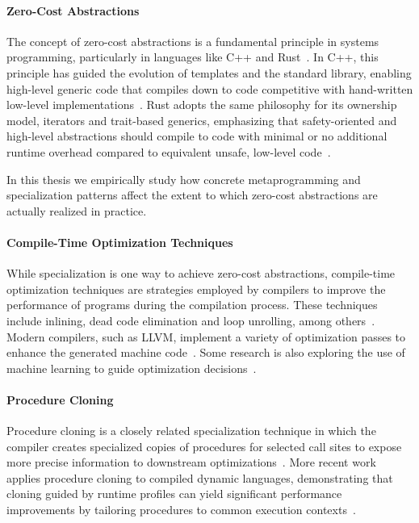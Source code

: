 \paragraph{Zero-Cost Abstractions}
The concept of zero-cost abstractions is a fundamental principle in systems programming, particularly in languages like C++ and Rust~\cite{Ho23}.
In C++, this principle has guided the evolution of templates and the standard library, enabling high-level generic code that compiles down to code competitive with hand-written low-level implementations~\cite{Stroustrup1994AbstractionEfficiency,Alexandrescu2001ModernCppDesign}.
Rust adopts the same philosophy for its ownership model, iterators and trait-based generics, emphasizing that safety-oriented and high-level abstractions should compile to code with minimal or no additional runtime overhead compared to equivalent unsafe, low-level code~\cite{Ho23,RustBook,RustNomicon}.

In this thesis we empirically study how concrete metaprogramming and specialization patterns affect the extent to which zero-cost abstractions are actually realized in practice.

\paragraph{Compile-Time Optimization Techniques}
While specialization is one way to achieve zero-cost abstractions, compile-time optimization techniques are strategies employed by compilers to improve the performance of programs during the compilation process.
These techniques include inlining, dead code elimination and loop unrolling, among others~\cite{Inlining97, Knoop94, LoopUnrolling99, CloneDetection98}.
Modern compilers, such as LLVM, implement a variety of optimization passes to enhance the generated machine code~\cite{Lattner04}.
Some research is also exploring the use of machine learning to guide optimization decisions~\cite{MLForCompilerOptimizations20}.

\paragraph{Procedure Cloning}
Procedure cloning is a closely related specialization technique in which the compiler creates specialized copies of procedures for selected call sites to expose more precise information to downstream optimizations~\cite{Cooper93}.
More recent work applies procedure cloning to compiled dynamic languages, demonstrating that cloning guided by runtime profiles can yield significant performance improvements by tailoring procedures to common execution contexts~\cite{Husk2022UsingPC}.

